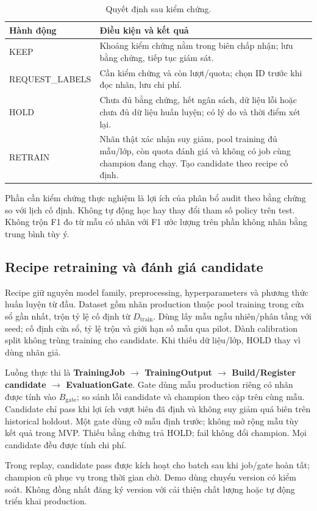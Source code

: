 \begin{table}[ht]
\centering
\caption{Quyết định sau kiểm chứng.}\label{tab:policy}
\begin{tabularx}{\linewidth}{@{}L{3.5cm} Y@{}}
\toprule\textbf{Hành động} & \textbf{Điều kiện và kết quả} \\
\midrule
KEEP & Khoảng kiểm chứng nằm trong biên chấp nhận; lưu bằng chứng, tiếp tục giám sát. \\
REQUEST\_LABELS & Cần kiểm chứng và còn lượt/quota; chọn ID trước khi đọc nhãn, lưu chi phí. \\
HOLD & Chưa đủ bằng chứng, hết ngân sách, dữ liệu lỗi hoặc chưa đủ dữ liệu huấn luyện; có lý do và thời điểm xét lại. \\
RETRAIN & Nhãn thật xác nhận suy giảm, pool training đủ mẫu/lớp, còn quota đánh giá và không có job cùng champion đang chạy. Tạo candidate theo recipe cố định. \\
\bottomrule
\end{tabularx}
\end{table}
Phần cần kiểm chứng thực nghiệm là lợi ích của phân bổ audit theo bằng chứng so với lịch cố định. Không tự động học hay thay đổi tham số policy trên test. Không trộn F1 đo từ mẫu có nhãn với F1 ước lượng trên phần không nhãn bằng trung bình tùy ý.

\subsection{Recipe retraining và đánh giá candidate}
Recipe giữ nguyên model family, preprocessing, hyperparameters và phương thức huấn luyện từ đầu. Dataset gồm nhãn production thuộc pool training trong cửa sổ gần nhất, trộn tỷ lệ cố định từ $D_{\mathrm{train}}$. Dùng lấy mẫu ngẫu nhiên/phân tầng với seed; cố định cửa sổ, tỷ lệ trộn và giới hạn số mẫu qua pilot. Dành calibration split không trùng training cho candidate. Khi thiếu dữ liệu/lớp, HOLD thay vì dùng nhãn giả.

Luồng thực thi là \textbf{TrainingJob $\rightarrow$ TrainingOutput $\rightarrow$ Build/Register candidate $\rightarrow$ EvaluationGate}. Gate dùng mẫu production riêng có nhãn được tính vào $B_{\mathrm{gate}}$; so sánh lỗi candidate và champion theo cặp trên cùng mẫu. Candidate chỉ pass khi lợi ích vượt biên đã định và không suy giảm quá biên trên historical holdout. Một gate dùng cỡ mẫu định trước; không mở rộng mẫu tùy kết quả trong MVP. Thiếu bằng chứng trả HOLD; fail không đổi champion. Mọi candidate đều được tính chi phí.

Trong replay, candidate pass được kích hoạt cho batch sau khi job/gate hoàn tất; champion cũ phục vụ trong thời gian chờ. Demo dùng chuyển version có kiểm soát. Không đồng nhất đăng ký version với cải thiện chất lượng hoặc tự động triển khai production.
